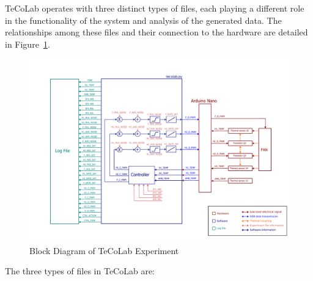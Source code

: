 \documentclass[12pt]{report}
\begin{document}
TeCoLab operates with three distinct types of files, each playing a different role in the functionality of the system and analysis of the generated data. The relationships among these files and their connection to the hardware are detailed in Figure~\ref{fig:TeCoLabBlockDiagram}.

\begin{figure}[!htbp]
\centering
\includegraphics[scale = 0.53]{Figures/TeCoLabBlockDiagram.pdf}
\caption{Block Diagram of TeCoLab Experiment}\label{fig:TeCoLabBlockDiagram}
\end{figure}

The three types of files in TeCoLab are:
\end{document}
